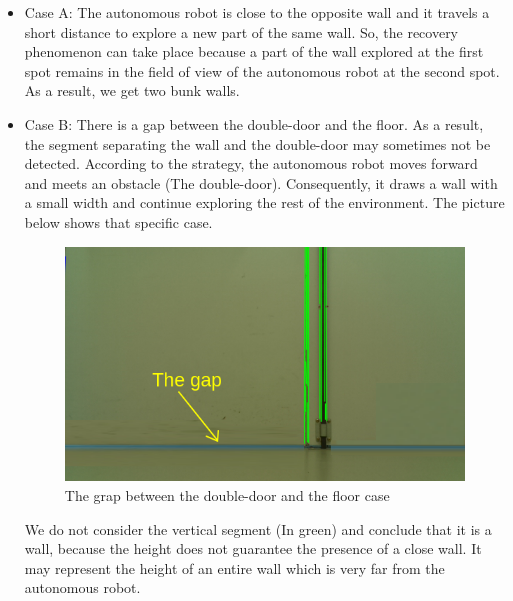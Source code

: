 \documentclass[12pt]{report}
\begin{document}
	\begin{itemize}
		\item Case A: The autonomous robot is close to the opposite wall and it travels a short distance to explore a new part of the same wall. So, the recovery phenomenon can take place because a part of the wall explored at the first spot remains in the field of view of the autonomous robot at the second spot. As a result, we get two bunk walls.
		\item Case B: There is a gap between the double-door and the floor. As a result, the segment separating the wall and the double-door may sometimes not be detected. According to the strategy, the autonomous robot moves forward and meets an obstacle (The double-door). Consequently, it draws a wall with a small width and continue exploring the rest of the environment. The picture below shows that specific case.

			\begin{figure}[H]
			\begin{center}
				\includegraphics[scale=0.50]{res/no_segment.png}
				\caption{The grap between the double-door and the floor case}
			\end{center}
			\end{figure}
		We do not consider the vertical segment (In green)  and conclude that it is a wall, because the height does not guarantee the presence of a close wall. It may represent the height of an entire wall which is very far from the autonomous robot.
		

\end{itemize}
\end{document}
